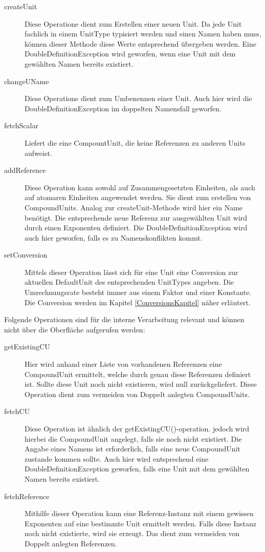 \begin{description}
\item[createUnit]
Diese Operatione dient zum Erstellen einer neuen Unit. Da jede Unit fachlich in einem UnitType typisiert werden und einen Namen haben muss, können dieser Methode diese Werte entsprechend übergeben werden. Eine DoubleDefinitionException wird geworfen, wenn eine Unit mit dem gewählten Namen bereits existiert.
\item[changeUName]
Diese Operatione dient zum Umbenennen einer Unit. Auch hier wird die DoubleDefinitionException im doppelten Namensfall geworfen.
\item[fetchScalar]
Liefert die eine CompountUnit, die keine Referenzen zu anderen Units aufweist.
\item[addReference]
Diese Operation kann sowohl auf Zusammengesetzten Einheiten, als auch auf atomaren Einheiten angewendet werden. Sie dient zum erstellen von CompoundUnits. Analog zur createUnit-Methode wird hier ein Name benötigt. Die entsprechende neue Referenz zur ausgewählten Unit wird durch einen Exponenten definiert. Die DoubleDefinitionException wird auch hier geworfen, falls es zu Namenskonflikten kommt.
\item[setConversion]
Mittels dieser Operation lässt sich für eine Unit eine Conversion zur aktuellen DefaultUnit des entsprechenden UnitTypes angeben. Die Umrechnungsrate besteht immer aus einem Faktor und einer Konstante. Die Conversion werden im Kapitel \ref{ConversionsKapitel} näher erläutert.
\end{description}

Folgende Operationen sind für die interne Verarbeitung relevant und können nicht über die Oberfläche aufgerufen werden:
\begin{description}

\item[getExistingCU]
Hier wird anhand einer Liste von vorhandenen Referenzen eine CompoundUnit ermittelt, welche durch genau diese Referenzen definiert ist. Sollte diese Unit noch nicht existieren, wird null zurückgeliefert. Diese Operation dient zum vermeiden von Doppelt anlegten CompoundUnits.
\item[fetchCU]
Diese Operation ist ähnlich der getExistingCU()-operation. jedoch wird hierbei die CompoundUnit angelegt, falls sie noch nicht existiert. Die Angabe eines Namens ist erforderlich, falls eine neue CompoundUnit zustande kommen sollte. Auch hier wird entsprechend eine DoubleDefinitionException geworfen, falls eine Unit mit dem gewählten Namen bereits existiert.
\item[fetchReference]
Mithilfe dieser Operation kann eine Referenz-Instanz mit einem gewissen Exponenten auf eine bestimmte Unit ermittelt werden. Falls diese Instanz noch nicht existierte, wird sie erzeugt. Das dient zum vermeiden von Doppelt anlegten Referenzen.
\end{description}


